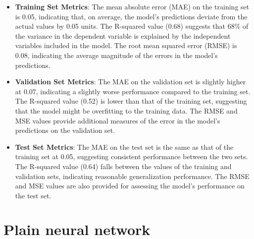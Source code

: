 \documentclass[10pt]{article} %
\begin{document}
\begin{itemize}
  \item \textbf{Training Set Metrics}: The mean absolute error (MAE) on the training set is 0.05, indicating that, on average, the model's predictions deviate from the actual values by 0.05 units. The R-squared value (0.68) suggests that 68\% of the variance in the dependent variable is explained by the independent variables included in the model. The root mean squared error (RMSE) is 0.08, indicating the average magnitude of the errors in the model's predictions.
  
  \item \textbf{Validation Set Metrics}: The MAE on the validation set is slightly higher at 0.07, indicating a slightly worse performance compared to the training set. The R-squared value (0.52) is lower than that of the training set, suggesting that the model might be overfitting to the training data. The RMSE and MSE values provide additional measures of the error in the model's predictions on the validation set.
  
  \item \textbf{Test Set Metrics}: The MAE on the test set is the same as that of the training set at 0.05, suggesting consistent performance between the two sets. The R-squared value (0.64) falls between the values of the training and validation sets, indicating reasonable generalization performance. The RMSE and MSE values are also provided for assessing the model's performance on the test set.
  
\end{itemize}
    \section{Plain neural network}
\end{document}
